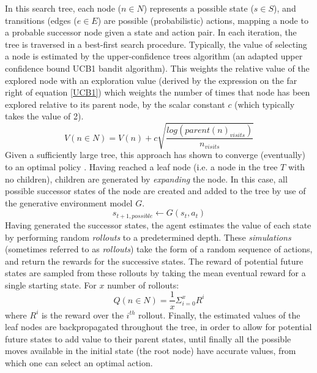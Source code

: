In this search tree, each node ($n \in N$) represents a possible state ($s \in S$), and transitions (edges ($e \in E$) are possible (probabilistic) actions, mapping a node to a probable successor node given a state and action pair. 
\newline \newline
In each iteration, the tree is traversed in a best-first search procedure. Typically, the value of selecting a node is estimated by the upper-confidence trees algorithm (an adapted upper confidence bound UCB1 bandit algorithm). This weights the relative value of the explored node with an exploration value (derived by the expression on the far right of equation \ref{UCB1}) which weights the number of times that node has been explored relative to its parent node, by the scalar constant $c$ (which typically takes the value of 2).
\begin{equation}\label{UCB1}
    V(n \in N) = V(n) + c \sqrt{\frac{log(parent(n)_{visits})}{n_{visits}}} 
\end{equation}
Given a sufficiently large tree, this approach has shown to converge (eventually) to an optimal policy \cite{Ross2011}. 
Having reached a leaf node (i.e. a node in the tree $T$ with no children), children are generated by \textit{expanding} the node. In this case, all possible successor states of the node are created and added to the tree by use of the generative environment model $G$. 
\begin{equation}
    s_{t+1, possible} \leftarrow G(s_t, a_t)
\end{equation}
Having generated the successor states, the agent estimates the value of each state by performing random \textit{rollouts} to a predetermined depth. These \textit{simulations} (sometimes referred to as \textit{rollouts}) take the form of a random sequence of actions, and return the rewards for the successive states. The reward of potential future states are sampled from these rollouts by taking the mean eventual reward for a single starting state. For $x$ number of rollouts:
\begin{equation}
    Q(n \in N) = \frac{1}{x}\Sigma_{i=0}^x R^i
\end{equation} 
where $R^i$ is the reward over the $i^{th}$ rollout.
\newline\newline
Finally, the estimated values of the leaf nodes are backpropagated throughout the tree, in order to allow for potential future states to add value to their parent states, until finally all the possible moves available in the initial state (the root node) have accurate values, from which one can select an optimal action. 
